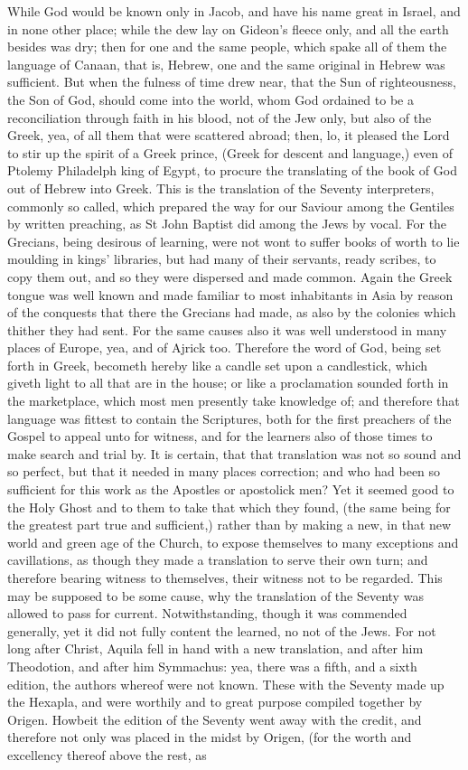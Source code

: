 While God would be known only in Jacob, and have his name great in Israel, and in none other place; while the dew lay on Gideon's fleece only, and all the earth besides was dry; then for one and the same people, which spake all of them the language of Canaan, that is, Hebrew, one and the same original in Hebrew was sufficient. But when the fulness of time drew near, that the Sun of righteousness, the Son of God, should come into the world, whom God ordained to be a reconciliation through faith in his blood, not of the Jew only, but also of the Greek, yea, of all them that were scattered abroad; then, lo, it pleased the Lord to stir up the spirit of a Greek prince, (Greek for descent and language,) even of Ptolemy Philadelph king of Egypt, to procure the translating of the book of God out of Hebrew into Greek. This is the translation of the Seventy interpreters, commonly so called, which prepared the way for our Saviour among the Gentiles by written preaching, as St John Baptist did among the Jews by vocal. For the Grecians, being desirous of learning, were not wont to suffer books of worth to lie moulding in kings' libraries, but had many of their servants, ready scribes, to copy them out, and so they were dispersed and made common. Again the Greek tongue was well known and made familiar to most inhabitants in Asia by reason of the conquests that there the Grecians had made, as also by the colonies which thither they had sent. For the same causes also it was well understood in many places of Europe, yea, and of Ajrick too. Therefore the word of God, being set forth in Greek, becometh hereby like a candle set upon a candlestick, which giveth light to all that are in the house; or like a proclamation sounded forth in the marketplace, which most men presently take knowledge of; and therefore that language was fittest to contain the Scriptures, both for the first preachers of the Gospel to appeal unto for witness, and for the learners also of those times to make search and trial by. It is certain, that that translation was not so sound and so perfect, but that it needed in many places correction; and who had been so sufficient for this work as the Apostles or apostolick men? Yet it seemed good to the Holy Ghost and to them to take that which they found, (the same being for the greatest part true and sufficient,) rather than by making a new, in that new world and green age of the Church, to expose themselves to many exceptions and cavillations, as though they made a translation to serve their own turn; and therefore bearing witness to themselves, their witness not to be regarded. This may be supposed to be some cause, why the translation of the Seventy was allowed to pass for current. Notwithstanding, though it was commended generally, yet it did not fully content the learned, no not of the Jews. For not long after Christ, Aquila fell in hand with a new translation, and after him Theodotion, and after him Symmachus: yea, there was a fifth, and a sixth edition, the authors whereof were not known. These with the Seventy made up the Hexapla, and were worthily and to great purpose compiled together by Origen. Howbeit the edition of the Seventy went away with the credit, and therefore not only was placed in the midst by Origen, (for the worth and excellency thereof above the rest, as 